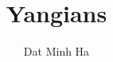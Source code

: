 

\setcounter{section}{-1}


\newcommand{\simpleroots}{\mathbb{I}}



    \title{Yangians}
    
    \author{Dat Minh Ha}
    \maketitle
    
    \begin{abstract}
    
    \end{abstract}
    
    {
    \hypersetup{} 
    \tableofcontents %
    }

    

    
    
    \printbibliography

